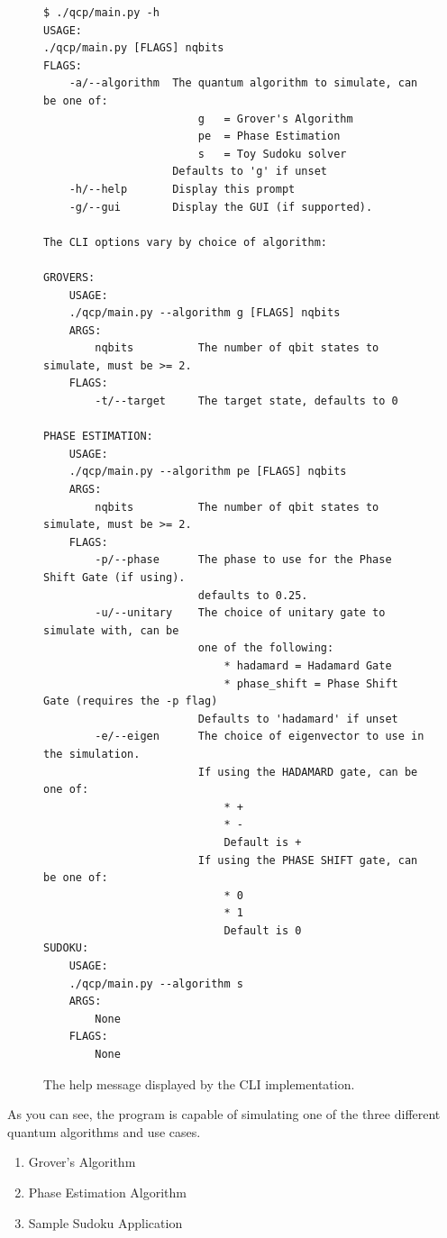 \documentclass{article}
\begin{document}
\begin{figure}[h]
\begin{footnotesize}
\begin{verbatim}
$ ./qcp/main.py -h
USAGE:
./qcp/main.py [FLAGS] nqbits
FLAGS:
    -a/--algorithm  The quantum algorithm to simulate, can be one of:
                        g   = Grover's Algorithm
                        pe  = Phase Estimation
                        s   = Toy Sudoku solver
                    Defaults to 'g' if unset
    -h/--help       Display this prompt
    -g/--gui        Display the GUI (if supported).

The CLI options vary by choice of algorithm:

GROVERS:
    USAGE:
    ./qcp/main.py --algorithm g [FLAGS] nqbits
    ARGS:
        nqbits          The number of qbit states to simulate, must be >= 2.
    FLAGS:
        -t/--target     The target state, defaults to 0

PHASE ESTIMATION:
    USAGE:
    ./qcp/main.py --algorithm pe [FLAGS] nqbits
    ARGS:
        nqbits          The number of qbit states to simulate, must be >= 2.
    FLAGS:
        -p/--phase      The phase to use for the Phase Shift Gate (if using).
                        defaults to 0.25.
        -u/--unitary    The choice of unitary gate to simulate with, can be
                        one of the following:
                            * hadamard = Hadamard Gate
                            * phase_shift = Phase Shift Gate (requires the -p flag)
                        Defaults to 'hadamard' if unset
        -e/--eigen      The choice of eigenvector to use in the simulation.
                        If using the HADAMARD gate, can be one of:
                            * +
                            * -
                            Default is +
                        If using the PHASE SHIFT gate, can be one of:
                            * 0
                            * 1
                            Default is 0
SUDOKU:
    USAGE:
    ./qcp/main.py --algorithm s
    ARGS:
        None
    FLAGS:
        None
\end{verbatim}
\end{footnotesize}
\caption{\label{cli-help} The help message displayed by the CLI implementation.}
\end{figure}

As you can see, the program is capable of simulating one of the three different quantum algorithms and use cases.

\begin{enumerate}
    \item Grover's Algorithm
    \item Phase Estimation Algorithm
    \item Sample Sudoku Application
\end{enumerate}
\end{document}
